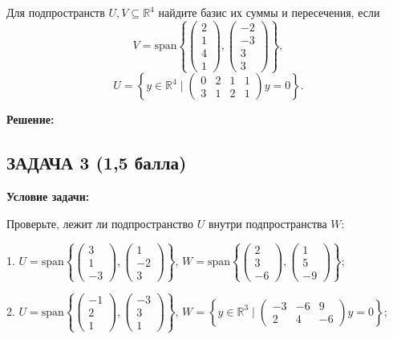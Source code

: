 \documentclass[a4paper,12pt]{article}
\begin{document}
Для подпространств \( U, V \subseteq \mathbb{R}^4 \) найдите базис их суммы и пересечения, если
\[
V = \text{span} \left\{
\begin{pmatrix}
2 \\
1 \\
4 \\
1
\end{pmatrix},
\begin{pmatrix}
-2 \\
-3 \\
3 \\
3
\end{pmatrix}
\right\},
\]
\[
U = \left\{ y \in \mathbb{R}^4 \mid
\begin{pmatrix}
0 & 2 & 1 & 1 \\
3 & 1 & 2 & 1
\end{pmatrix}
y = 0
\right\}.
\]

\textbf{Решение:}


\vspace{1cm}

\subsection{ЗАДАЧА 3 \hfill \textbf{(1,5 балла)}}
\textbf{Условие задачи:}

Проверьте, лежит ли подпространство \( U \) внутри подпространства \( W \):

1. \( U = \text{span} \left\{
\begin{pmatrix}
3 \\
1 \\
-3
\end{pmatrix},
\begin{pmatrix}
1 \\
-2 \\
3
\end{pmatrix}
\right\} \),
\( W = \text{span} \left\{
\begin{pmatrix}
2 \\
3 \\
-6
\end{pmatrix},
\begin{pmatrix}
1 \\
5 \\
-9
\end{pmatrix}
\right\} \);

2. \( U = \text{span} \left\{
\begin{pmatrix}
-1 \\
2 \\
1
\end{pmatrix},
\begin{pmatrix}
-3 \\
3 \\
1
\end{pmatrix}
\right\} \),
\( W = \left\{ y \in \mathbb{R}^3 \mid
\begin{pmatrix}
-3 & -6 & 9 \\
2 & 4 & -6
\end{pmatrix}
y = 0
\right\} \);
\end{document}
